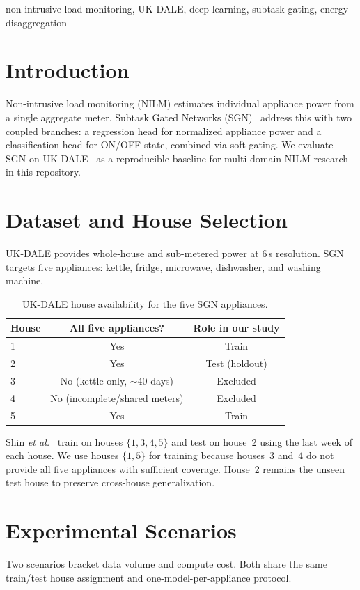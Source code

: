 \documentclass[conference]{IEEEtran}
\begin{document}
\begin{IEEEkeywords}
non-intrusive load monitoring, UK-DALE, deep learning, subtask gating, energy disaggregation
\end{IEEEkeywords}

\section{Introduction}
Non-intrusive load monitoring (NILM) estimates individual appliance power from a single aggregate meter.
Subtask Gated Networks (SGN)~\cite{shin2019sgn} address this with two coupled branches: a regression head for normalized appliance power and a classification head for ON/OFF state, combined via soft gating.
We evaluate SGN on UK-DALE~\cite{kelly2015ukdale} as a reproducible baseline for multi-domain NILM research in this repository.

\section{Dataset and House Selection}
UK-DALE provides whole-house and sub-metered power at 6\,s resolution.
SGN targets five appliances: kettle, fridge, microwave, dishwasher, and washing machine.

\begin{table}[htbp]
\caption{UK-DALE house availability for the five SGN appliances.}
\label{tab:houses}
\centering
\begin{tabular}{@{}lcc@{}}
\toprule
\textbf{House} & \textbf{All five appliances?} & \textbf{Role in our study} \\
\midrule
1 & Yes & Train \\
2 & Yes & Test (holdout) \\
3 & No (kettle only, $\sim$40 days) & Excluded \\
4 & No (incomplete/shared meters) & Excluded \\
5 & Yes & Train \\
\bottomrule
\end{tabular}
\end{table}

Shin \textit{et al.}~\cite{shin2019sgn} train on houses $\{1,3,4,5\}$ and test on house~2 using the last week of each house.
We use houses $\{1,5\}$ for training because houses~3 and~4 do not provide all five appliances with sufficient coverage.
House~2 remains the unseen test house to preserve cross-house generalization.

\section{Experimental Scenarios}
Two scenarios bracket data volume and compute cost.
Both share the same train/test house assignment and one-model-per-appliance protocol.
\end{document}
